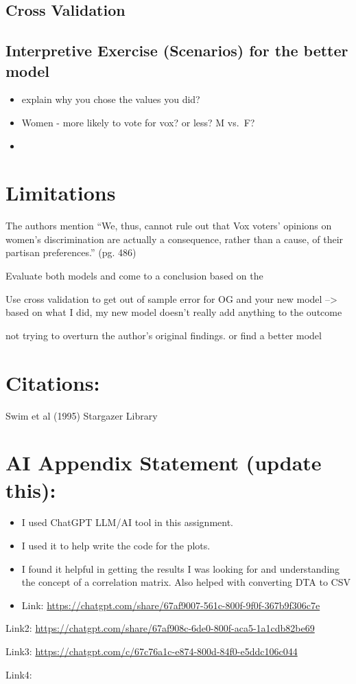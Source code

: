 \documentclass[
  letterpaper,
  DIV=11,
  numbers=noendperiod]{scrartcl}
\begin{document}
\subsection{Cross Validation}\label{cross-validation}

\subsection{Interpretive Exercise (Scenarios) for the better
model}\label{interpretive-exercise-scenarios-for-the-better-model}

\begin{itemize}
\item
  explain why you chose the values you did?
\item
  Women - more likely to vote for vox? or less? M vs.~F?
\item
\end{itemize}

\section{Limitations}\label{limitations}

The authors mention ``We, thus, cannot rule out that Vox voters'
opinions on women's discrimination are actually a consequence, rather
than a cause, of their partisan preferences.'' (pg. 486)

Evaluate both models and come to a conclusion based on the

Use cross validation to get out of sample error for OG and your new
model --\textgreater{} based on what I did, my new model doesn't really
add anything to the outcome

not trying to overturn the author's original findings. or find a better
model

\section{Citations:}\label{citations}

Swim et al (1995) Stargazer Library

\section{AI Appendix Statement (update
this):}\label{ai-appendix-statement-update-this}

\begin{itemize}
\item
  I used ChatGPT LLM/AI tool in this assignment.
\item
  I used it to help write the code for the plots. ~
\item
  I found it helpful in getting the results I was looking for and
  understanding the concept of a correlation matrix. Also helped with
  converting DTA to CSV
\item
  Link:
  \url{https://chatgpt.com/share/67af9007-561c-800f-9f0f-367b9f306c7e}
\end{itemize}

Link2:
\url{https://chatgpt.com/share/67af908c-6de0-800f-aca5-1a1cdb82be69}

Link3: \url{https://chatgpt.com/c/67c76a1c-e874-800d-84f0-e5ddc106c044}

Link4:\\
\end{document}
